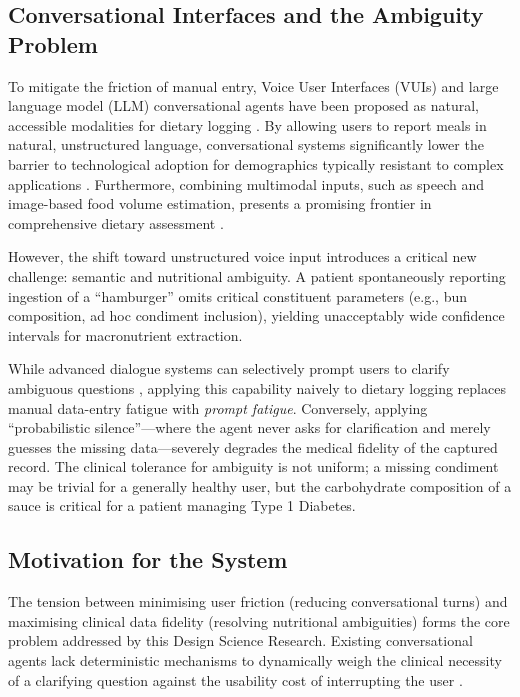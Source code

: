 \subsection{Conversational Interfaces and the Ambiguity Problem}

To mitigate the friction of manual entry, Voice User Interfaces (VUIs) and large language model (LLM) conversational agents have been proposed as natural, accessible modalities for dietary logging \citep{tuConversationalDiagnosticArtificial2025,sumersCognitiveArchitecturesLanguage2023}. By allowing users to report meals in natural, unstructured language, conversational systems significantly lower the barrier to technological adoption for demographics typically resistant to complex applications \citep{berkowskyFactorsPredictingDecisions2017}. Furthermore, combining multimodal inputs, such as speech and image-based food volume estimation, presents a promising frontier in comprehensive dietary assessment \citep{zhangImagebasedMethodsDietary2024,loImageBasedFoodClassification2020}.

However, the shift toward unstructured voice input introduces a critical new challenge: semantic and nutritional ambiguity. A patient spontaneously reporting ingestion of a ``hamburger'' omits critical constituent parameters (e.g., bun composition, ad hoc condiment inclusion), yielding unacceptably wide confidence intervals for macronutrient extraction.

While advanced dialogue systems can selectively prompt users to clarify ambiguous questions \citep{kuhnCLAMSelectiveClarification2023,yaoReActSynergizingReasoning2022}, applying this capability naively to dietary logging replaces manual data-entry fatigue with \emph{prompt fatigue}. Conversely, applying ``probabilistic silence''---where the agent never asks for clarification and merely guesses the missing data---severely degrades the medical fidelity of the captured record. The clinical tolerance for ambiguity is not uniform; a missing condiment may be trivial for a generally healthy user, but the carbohydrate composition of a sauce is critical for a patient managing Type 1 Diabetes.

\subsection{Motivation for the System}

The tension between minimising user friction (reducing conversational turns) and maximising clinical data fidelity (resolving nutritional ambiguities) forms the core problem addressed by this Design Science Research. Existing conversational agents lack deterministic mechanisms to dynamically weigh the clinical necessity of a clarifying question against the usability cost of interrupting the user \citep{xiRisePotentialLarge2025,myersPatternsHowUsers2018}.

